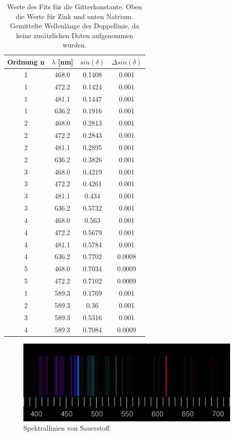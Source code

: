 \documentclass[]{article}
\begin{document}
\begin{table}[H]
\centering
\begin{tabular}{|c|c|c|c|}
\hline
Ordnung n & $\lambda$ [nm] & $sin(\delta)$ & $\Delta sin(\delta)$ \\ \hline\hline
1 & 468.0 & 0.1408 & 0.001 \\ \hline
1 & 472.2 & 0.1424 & 0.001 \\ \hline
1 & 481.1 & 0.1447 & 0.001 \\ \hline
1 & 636.2 & 0.1916 & 0.001 \\ \hline
2 & 468.0 & 0.2813 & 0.001 \\ \hline
2 & 472.2 & 0.2843 & 0.001 \\ \hline
2 & 481.1 & 0.2895 & 0.001 \\ \hline
2 & 636.2 & 0.3826 & 0.001 \\ \hline
3 & 468.0 & 0.4219 & 0.001 \\ \hline
3 & 472.2 & 0.4261 & 0.001 \\ \hline
3 & 481.1 & 0.434 & 0.001 \\ \hline
3 & 636.2 & 0.5732 & 0.001 \\ \hline
4 & 468.0 & 0.563 & 0.001 \\ \hline
4 & 472.2 & 0.5679 & 0.001 \\ \hline
4 & 481.1 & 0.5784 & 0.001 \\ \hline
4 & 636.2 & 0.7702 & 0.0008 \\ \hline
5 & 468.0 & 0.7034 & 0.0009 \\ \hline
5 & 472.2 & 0.7102 & 0.0009 \\ \hline
\hline \hline
1 & 589.3 & 0.1769 & 0.001 \\ \hline
2 & 589.3 & 0.36 & 0.001 \\ \hline
3 & 589.3 & 0.5316 & 0.001 \\ \hline
4 & 589.3 & 0.7084 & 0.0009 \\ \hline
\hline
\end{tabular}
\caption{Werte des Fits für die Gitterkonstante. Oben die Werte für Zink und unten Natrium. Gemittelte Wellenlänge der Doppellinie, da keine zusätzlichen Daten aufgenommen wurden.\label{c Data}}
\end{table}

\begin{figure}[H]
\includegraphics[width=1\textwidth]{Plots/spektO.png}
\caption{Spektrallinien von Sauerstoff. \cite{spektO}}
\label{O Linien}
\end{figure}
\end{document}
